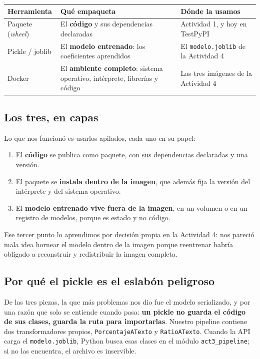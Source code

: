 \documentclass[12pt,a4paper]{article}
\begin{document}
\begin{center}
\begin{tabular}{|l|p{4.2cm}|p{5.2cm}|}
\hline
\textbf{Herramienta} & \textbf{Qué empaqueta} & \textbf{Dónde la usamos} \\
\hline
Paquete (\emph{wheel}) & El \textbf{código} y sus dependencias declaradas & Actividad 1, y hoy en
TestPyPI \\
\hline
Pickle / joblib & El \textbf{modelo entrenado}: los coeficientes aprendidos & El
\texttt{modelo.joblib} de la Actividad 4 \\
\hline
Docker & El \textbf{ambiente completo}: sistema operativo, intérprete, librerías y código & Las
tres imágenes de la Actividad 4 \\
\hline
\end{tabular}
\end{center}

\subsection{Los tres, en capas}

Lo que nos funcionó es usarlos apilados, cada uno en su papel:

\begin{enumerate}[leftmargin=1.4em]
\item El \textbf{código} se publica como paquete, con sus dependencias declaradas y una versión.
\item El paquete se \textbf{instala dentro de la imagen}, que además fija la versión del
intérprete y del sistema operativo.
\item El \textbf{modelo entrenado vive fuera de la imagen}, en un volumen o en un registro de
modelos, porque es estado y no código.
\end{enumerate}

Ese tercer punto lo aprendimos por decisión propia en la Actividad 4: nos pareció mala idea
hornear el modelo dentro de la imagen porque reentrenar habría obligado a reconstruir y
redistribuir la imagen completa.

\subsection{Por qué el pickle es el eslabón peligroso}

De las tres piezas, la que más problemas nos dio fue el modelo serializado, y por una razón que
solo se entiende cuando pasa: \textbf{un pickle no guarda el código de sus clases, guarda la ruta
para importarlas}. Nuestro pipeline contiene dos transformadores propios,
\texttt{PorcentajeATexto} y \texttt{RatioATexto}. Cuando la API carga el
\texttt{modelo.joblib}, Python busca esas clases en el módulo \texttt{act3\_pipeline}; si no las
encuentra, el archivo es inservible.
\end{document}

